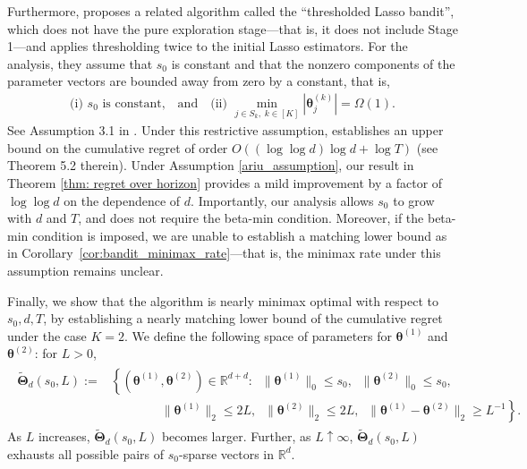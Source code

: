\documentclass[aos,preprint]{imsart}
\theoremstyle{plain}
\theoremstyle{definition}
\newcommand{\bTheta}{\boldsymbol{\Theta}}
\newcommand{\btheta}{\boldsymbol{\theta}}
\newcommand{\bR}{\mathbb{R}}
\begin{document}
Furthermore, \cite{ariu2022thresholded} proposes a related algorithm called the ``thresholded Lasso bandit'',   which does not have the pure exploration stage---that is,  it does not include Stage 1---and applies thresholding twice to the initial Lasso estimators.  For the analysis, they assume that $s_0$ is constant and that the nonzero components of the parameter vectors are bounded away from zero by a constant, that is,
\begin{align}\label{ariu_assumption}
    \text{(i) } s_0 \text{ is constant,} \quad \text{and} \quad \text{(ii) } \min_{j \in S_k,\; k \in [K]} |\btheta^{(k)}_j| = \Omega(1).
\end{align}
See Assumption 3.1 in \cite{ariu2022thresholded}.  Under this restrictive assumption,  
\cite{ariu2022thresholded} establishes an upper bound on the cumulative regret of order $O( (\log\log d)  \log d  +  \log T)$ (see Theorem 5.2 therein). Under Assumption \eqref{ariu_assumption}, our result in Theorem \ref{thm: regret over horizon} provides a mild improvement by a factor of $\log\log d$ on the dependence of $d$.  Importantly, our analysis allows   $s_0$ to grow with $d$ and $T$, and does not require the beta-min condition. Moreover, if the beta-min condition is imposed, we are unable to establish a matching lower bound as in Corollary~\ref{cor:bandit_minimax_rate}—that is, the minimax rate under this assumption remains unclear.
 





Finally, we show that the algorithm is nearly minimax optimal with respect to $s_0,d,T$, by establishing a nearly matching lower bound of the cumulative regret under the case $K=2$.  We define the following space of parameters for $\btheta^{(1)}$ and $\btheta^{(2)}$: for $L > 0$,
\begin{align*}
\begin{split}
        \widetilde{\bTheta}_{d}(s_0,L) := & \left\{(\btheta^{(1)},\btheta^{(2)}) \in \bR^{d + d}:\;\; \|\btheta^{(1)}\|_0 \leq s_0, \; \;\|\btheta^{(2)}\|_0 \leq s_0, \;\; \right.\\
    &  \left. \qquad\qquad \|\btheta^{(1)}\|_{2} \leq 2L, \;\; \|\btheta^{(2)}\|_{2} \leq 2L, \;\;
    \|\btheta^{(1)} -\btheta^{(2)} \|_{2} \geq L^{-1} \right\}.
    \end{split}
\end{align*}
As $L$ increases, $\widetilde{\bTheta}_{d}(s_0,L)$ becomes larger. Further, as $L \uparrow \infty$, $\widetilde{\bTheta}_d(s_0, L)$ exhausts all possible pairs of $s_0$-sparse vectors in $\bR^{d}$.
 
\end{document}
